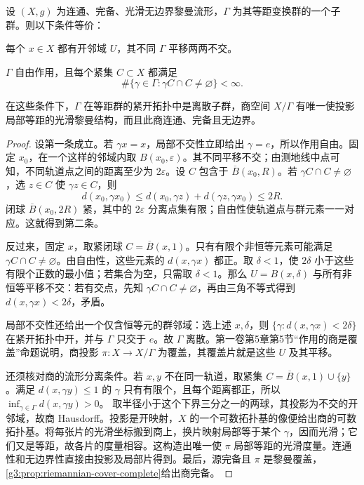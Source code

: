 \begin{lemma}\label{g3:lem:space-form-quotient-action}
	设 \((X,g)\) 为连通、完备、光滑无边界黎曼流形，\(\Gamma\) 为其等距变换群的一个子群。则以下条件等价：
	\begin{equivalences}
		\item 每个 \(x\in X\) 都有开邻域 \(U\)，其不同 \(\Gamma\) 平移两两不交。
		\item \(\Gamma\) 自由作用，且每个紧集 \(C\subset X\) 都满足
		\[
			\#\{\gamma\in\Gamma:\gamma C\cap C\ne\varnothing\}<\infty.
		\]
	\end{equivalences}
	在这些条件下，\(\Gamma\) 在等距群的紧开拓扑中是离散子群，商空间 \(X/\Gamma\) 有唯一使投影局部等距的光滑黎曼结构，而且此商连通、完备且无边界。
\end{lemma}
\begin{proof}
	设第一条成立。若 \(\gamma x=x\)，局部不交性立即给出 \(\gamma=e\)，所以作用自由。固定 \(x_0\)，在一个这样的邻域内取 \(B(x_0,\varepsilon)\)。其不同平移不交；由测地线中点可知，不同轨道点之间的距离至少为 \(2\varepsilon\)。设 \(C\) 包含于 \(\overline B(x_0,R)\)。若 \(\gamma C\cap C\ne\varnothing\)，选 \(z\in C\) 使 \(\gamma z\in C\)，则
	\[
		d(x_0,\gamma x_0)
		\le d(x_0,\gamma z)+d(\gamma z,\gamma x_0)
		\le2R.
	\]
	闭球 \(\overline B(x_0,2R)\) 紧，其中的 \(2\varepsilon\) 分离点集有限；自由性使轨道点与群元素一一对应。这就得到第二条。

	反过来，固定 \(x\)，取紧闭球 \(C=\overline B(x,1)\)。只有有限个非恒等元素可能满足 \(\gamma C\cap C\ne\varnothing\)。由自由性，这些元素的 \(d(x,\gamma x)\) 都正。取 \(\delta<1\)，使 \(2\delta\) 小于这些有限个正数的最小值；若集合为空，只需取 \(\delta<1\)。那么 \(U=B(x,\delta)\) 与所有非恒等平移不交：若有交点，先知 \(\gamma C\cap C\ne\varnothing\)，再由三角不等式得到 \(d(x,\gamma x)<2\delta\)，矛盾。

	局部不交性还给出一个仅含恒等元的群邻域：选上述 \(x,\delta\)，则
	\(\{\gamma:d(x,\gamma x)<2\delta\}\)
	在紧开拓扑中开，并与 \(\Gamma\) 只交于 \(e\)。故 \(\Gamma\) 离散。第一卷第5章第5节“作用的商是覆盖”命题说明，商投影 \(\pi:X\to X/\Gamma\) 为覆盖，其覆盖片就是这些 \(U\) 及其平移。

	还须核对商的流形分离条件。若 \(x,y\) 不在同一轨道，取紧集 \(C=\overline B(x,1)\cup\{y\}\)。满足 \(d(x,\gamma y)\le1\) 的 \(\gamma\) 只有有限个，且每个距离都正，所以
	\(\inf_{\gamma\in\Gamma}d(x,\gamma y)>0\)。
	取半径小于这个下界三分之一的两球，其投影为不交的开邻域，故商 Hausdorff。投影是开映射，\(X\) 的一个可数拓扑基的像便给出商的可数拓扑基。将每张片的光滑坐标搬到商上，换片映射局部等于某个 \(\gamma\)，因而光滑；它们又是等距，故各片的度量相容。这构造出唯一使 \(\pi\) 局部等距的光滑度量。连通性和无边界性直接由投影及局部片得到。最后，源完备且 \(\pi\) 是黎曼覆盖，\cref{g3:prop:riemannian-cover-complete}给出商完备。
\end{proof}

